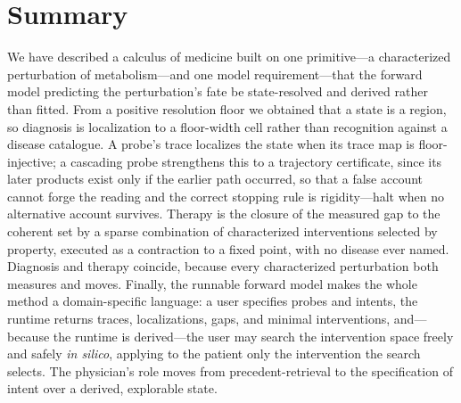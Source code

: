 \documentclass[11pt,a4paper]{article}
\theoremstyle{thmstyle}
\theoremstyle{definition}
\theoremstyle{remark}
\begin{document}
\section{Summary}
\label{sec:summary}

We have described a calculus of medicine built on one primitive---a
characterized perturbation of metabolism---and one model requirement---that
the forward model predicting the perturbation's fate be state-resolved and
derived rather than fitted. From a positive resolution floor we obtained
that a state is a region, so diagnosis is localization to a floor-width cell
rather than recognition against a disease catalogue. A probe's trace
localizes the state when its trace map is floor-injective; a cascading
probe strengthens this to a trajectory certificate, since its later
products exist only if the earlier path occurred, so that a false account
cannot forge the reading and the correct stopping rule is rigidity---halt
when no alternative account survives. Therapy is the closure of the measured
gap to the coherent set by a sparse combination of characterized
interventions selected by property, executed as a contraction to a fixed
point, with no disease ever named. Diagnosis and therapy coincide, because
every characterized perturbation both measures and moves. Finally, the
runnable forward model makes the whole method a domain-specific language: a
user specifies probes and intents, the runtime returns traces,
localizations, gaps, and minimal interventions, and---because the runtime
is derived---the user may search the intervention space freely and safely
\emph{in silico}, applying to the patient only the intervention the search
selects. The physician's role moves from precedent-retrieval to the
specification of intent over a derived, explorable state.
\end{document}
